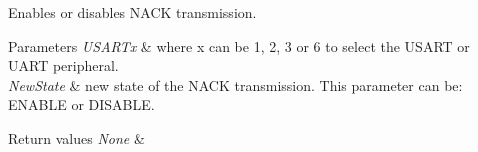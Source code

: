 Enables or disables N\+A\+CK transmission. 


\begin{DoxyParams}{Parameters}
{\em U\+S\+A\+R\+Tx} & where x can be 1, 2, 3 or 6 to select the U\+S\+A\+RT or U\+A\+RT peripheral. \\
\hline
{\em New\+State} & new state of the N\+A\+CK transmission. This parameter can be\+: E\+N\+A\+B\+LE or D\+I\+S\+A\+B\+LE. \\
\hline
\end{DoxyParams}

\begin{DoxyRetVals}{Return values}
{\em None} & \\
\hline
\end{DoxyRetVals}
